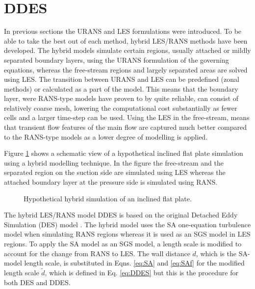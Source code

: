 \section{DDES}
In previous sections the URANS and LES formulations were introduced. To be able to take the best out of each method, hybrid LES/RANS methods have been developed. The hybrid models simulate certain regions, usually attached or mildly separated boundary layers, using the URANS formulation of the governing equations, whereas the free-stream regions and largely separated areas are solved using LES. The transition between URANS and LES can be predefined (zonal methods) or calculated as a part of the model. This means that the boundary layer, were RANS-type models have proven to by quite reliable, can consist of relatively coarse mesh, lowering the computational cost substantially as fewer cells and a larger time-step can be used. Using the LES in the free-stream, means that transient flow features of the main flow are captured much better compared to the RANS-type models as a lower degree of modelling is applied.

Figure \ref{fig:FPDDES} shows a schematic view of a hypothetical inclined flat plate simulation using a hybrid modelling technique. In the figure the free-stream and the separated region on the suction side are simulated using LES whereas the attached boundary layer at the pressure side is simulated using RANS.
\begin{figure}[H]
  \centering

  \caption{Hypothetical hybrid simulation of an inclined flat plate.}\label{fig:FPDDES}
\end{figure}

The hybrid LES/RANS model DDES is based on the original Detached Eddy Simulation (DES) model \cite{DES97}. The hybrid model uses the SA one-equation turbulence model when simulating RANS regions whereas it is used as an SGS model in LES regions. To apply the SA model as an SGS model, a length scale is modified to account for the change from RANS to LES. The wall distance $d$, which is the SA-model length scale, is substituted in Eqns. \ref{eq:SA} and \ref{eq:SAf} for the modified length scale $\tilde{d}$, which is defined in Eq. \ref{eq:DDES} but this is the procedure for both DES and DDES. 

